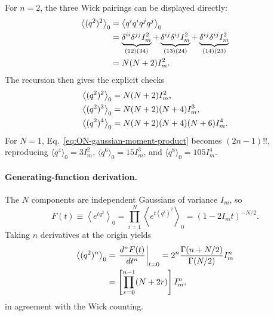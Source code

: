 For $n=2$, the three Wick pairings can be displayed directly:
\begin{align}
  \left\langle(q^2)^2\right\rangle_0
  &=\left\langle q^iq^iq^jq^j\right\rangle_0
  \notag\\
  &=\underbrace{\delta^{ii}\delta^{jj}I_m^2}_{(12)(34)}
   +\underbrace{\delta^{ij}\delta^{ij}I_m^2}_{(13)(24)}
   +\underbrace{\delta^{ij}\delta^{ij}I_m^2}_{(14)(23)}
  \notag\\
  &=N(N+2)I_m^2.
  \label{eq:q4-three-wick-pairings}
\end{align}
The recursion then gives the explicit checks
\begin{align}
  \left\langle(q^2)^2\right\rangle_0
  &=N(N+2)I_m^2,
  \notag\\
  \left\langle(q^2)^3\right\rangle_0
  &=N(N+2)(N+4)I_m^3,
  \notag\\
  \left\langle(q^2)^4\right\rangle_0
  &=N(N+2)(N+4)(N+6)I_m^4.
  \label{eq:low-n-ON-gaussian-moments}
\end{align}
For $N=1$, Eq.~\eqref{eq:ON-gaussian-moment-product} becomes
$(2n-1)!!$, reproducing
$\langle q^4\rangle_0=3I_m^2$,
$\langle q^6\rangle_0=15I_m^3$, and
$\langle q^8\rangle_0=105I_m^4$.

\paragraph{Generating-function derivation.}
The $N$ components are independent Gaussians of variance $I_m$, so
\begin{equation}
  F(t)\equiv\left\langle e^{tq^2}\right\rangle_0
  =\prod_{i=1}^N\left\langle e^{t(q^i)^2}\right\rangle_0
  =(1-2I_mt)^{-N/2}.
\end{equation}
Taking $n$ derivatives at the origin yields
\begin{align}
  \left\langle(q^2)^n\right\rangle_0
  &=\left.\frac{d^nF(t)}{dt^n}\right|_{t=0}
  =2^n\frac{\Gamma(n+N/2)}{\Gamma(N/2)}I_m^n
  \notag\\
  &=\left[\prod_{r=0}^{n-1}(N+2r)\right]I_m^n,
  \label{eq:ON-gaussian-moment-gamma}
\end{align}
in agreement with the Wick counting.


